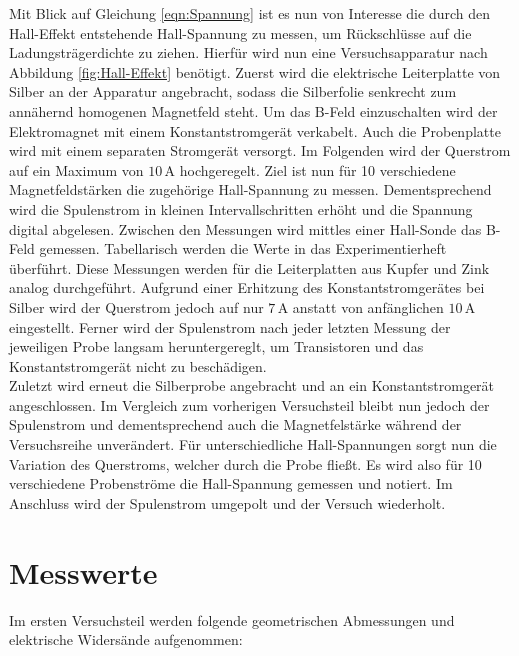 \noindent Mit Blick auf Gleichung \eqref{eqn:Spannung} ist es nun von Interesse die durch den Hall-Effekt entstehende 
Hall-Spannung zu messen, um Rückschlüsse auf die Ladungsträgerdichte zu ziehen. Hierfür wird nun eine Versuchsapparatur 
nach Abbildung \ref{fig:Hall-Effekt} benötigt. Zuerst wird die elektrische Leiterplatte von Silber an der Apparatur 
angebracht, sodass die Silberfolie senkrecht zum annähernd homogenen Magnetfeld steht. Um das B-Feld einzuschalten wird 
der Elektromagnet mit einem Konstantstromgerät verkabelt. Auch die Probenplatte wird mit einem separaten Stromgerät versorgt.
Im Folgenden wird der Querstrom auf ein Maximum von $10\,\unit{\ampere}$ hochgeregelt. Ziel ist nun für 10 verschiedene 
Magnetfeldstärken die zugehörige Hall-Spannung zu messen. Dementsprechend wird die Spulenstrom in kleinen Intervallschritten 
erhöht und die Spannung digital abgelesen. Zwischen den Messungen wird mittles einer Hall-Sonde das B-Feld gemessen. Tabellarisch 
werden die Werte in das Experimentierheft überführt. Diese Messungen werden für die Leiterplatten aus Kupfer und Zink analog 
durchgeführt. Aufgrund einer Erhitzung des Konstantstromgerätes bei Silber wird der Querstrom jedoch auf nur $7\,\unit{\ampere}$
anstatt von anfänglichen $10\,\unit{\ampere}$ eingestellt. Ferner wird der Spulenstrom nach jeder letzten Messung der jeweiligen 
Probe langsam heruntergereglt, um Transistoren und das Konstantstromgerät nicht zu beschädigen.\\

\noindent Zuletzt wird erneut die Silberprobe angebracht und an ein Konstantstromgerät angeschlossen. Im Vergleich zum vorherigen 
Versuchsteil bleibt nun jedoch der Spulenstrom und dementsprechend auch die Magnetfelstärke während der Versuchsreihe unverändert.
Für unterschiedliche Hall-Spannungen sorgt nun die Variation des Querstroms, welcher durch die Probe fließt. Es wird also für 10 
verschiedene Probenströme die Hall-Spannung gemessen und notiert. Im Anschluss wird der Spulenstrom umgepolt und der Versuch wiederholt.\\

\noindent 

\section{Messwerte}
\label{sec:Messwerte}

Im ersten Versuchsteil werden folgende geometrischen Abmessungen und elektrische Widersände aufgenommen:

